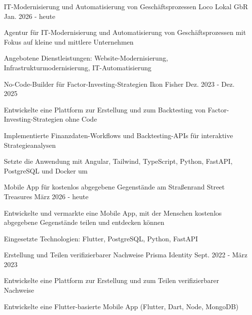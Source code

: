 


\begin{cventries}
\cventry
{IT-Modernisierung und Automatisierung von Geschäftsprozessen} %
{Loco Lokal GbR} %
{} %
{Jan. 2026 - heute} %
{ %
\begin{cvitems}
\item {Agentur für IT-Modernisierung und Automatisierung von Geschäftsprozessen mit Fokus auf kleine und mittlere Unternehmen}
\item {Angebotene Dienstleistungen: Website-Modernisierung, Infrastrukturmodernisierung, IT-Automatisierung}
\end{cvitems}
}

\cventry
{No-Code-Builder für Factor-Investing-Strategien} %
{Ikon Fisher} %
{} %
{Dez. 2023 - Dez. 2025} %
{ %
\begin{cvitems}
\item {Entwickelte eine Plattform zur Erstellung und zum Backtesting von Factor-Investing-Strategien ohne Code}
\item {Implementierte Finanzdaten-Workflows und Backtesting-APIs für interaktive Strategieanalysen}
\item {Setzte die Anwendung mit Angular, Tailwind, TypeScript, Python, FastAPI, PostgreSQL und Docker um}
\end{cvitems}
}
\cventry
{Mobile App für kostenlos abgegebene Gegenstände am Straßenrand} %
{Street Treasures} %
{} %
{März 2026 - heute} %
{ %
\begin{cvitems}
\item {Entwickelte und vermarkte eine Mobile App, mit der Menschen kostenlos abgegebene Gegenstände teilen und entdecken können}
\item {Eingesetzte Technologien: Flutter, PostgreSQL, Python, FastAPI}
\end{cvitems}
}
\cventry
{Erstellung und Teilen verifizierbarer Nachweise} %
{Prisma Identity} %
{} %
{Sept. 2022 - März 2023} %
{ %
\begin{cvitems}
\item {Entwickelte eine Plattform zur Erstellung und zum Teilen verifizierbarer Nachweise}
\item {Entwickelte eine Flutter-basierte Mobile App (Flutter, Dart, Node, MongoDB)}
\end{cvitems}
}


\end{cventries}
